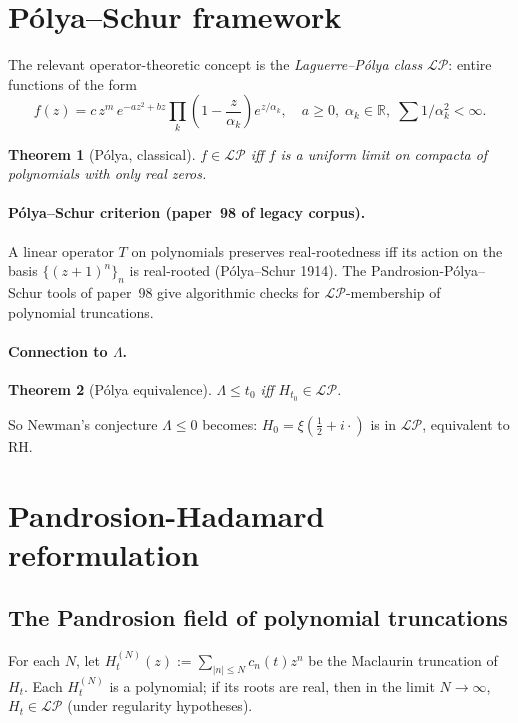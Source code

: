 \documentclass[11pt,a4paper]{article}
\newtheorem{theorem}{Theorem}[section]
\begin{document}
\section{P\'olya--Schur framework}\label{sec:polya}

The relevant operator-theoretic concept is the \emph{Laguerre--P\'olya class}
$\mathcal{LP}$: entire functions of the form
\[
f(z) = c\, z^m\, e^{-az^2 + bz}\prod_{k}\left(1 - \frac{z}{\alpha_k}\right) e^{z/\alpha_k},
\quad a \ge 0, \; \alpha_k \in \mathbb{R}, \; \sum 1/\alpha_k^2 < \infty.
\]

\begin{theorem}[P\'olya, classical]\label{thm:polya}
$f \in \mathcal{LP}$ iff $f$ is a uniform limit on compacta of polynomials
with only real zeros.
\end{theorem}

\paragraph{P\'olya--Schur criterion (paper~98 of legacy corpus).}
A linear operator $T$ on polynomials preserves real-rootedness iff its action
on the basis $\{(z+1)^n\}_n$ is real-rooted (P\'olya--Schur 1914). The
Pandrosion-P\'olya--Schur tools of paper~98 give algorithmic checks for
$\mathcal{LP}$-membership of polynomial truncations.

\paragraph{Connection to $\Lambda$.}
\begin{theorem}[P\'olya equivalence]\label{thm:polya-equiv}
$\Lambda \le t_0$ iff $H_{t_0} \in \mathcal{LP}$.
\end{theorem}

\noindent So Newman's conjecture $\Lambda \le 0$ becomes:
$H_0 = \xi(\tfrac{1}{2} + i\cdot)$ is in $\mathcal{LP}$, equivalent to RH.

\section{Pandrosion-Hadamard reformulation}\label{sec:reform}

\subsection{The Pandrosion field of polynomial truncations}

For each $N$, let $H_t^{(N)}(z) := \sum_{|n| \le N} c_n(t) z^n$ be the
Maclaurin truncation of $H_t$. Each $H_t^{(N)}$ is a polynomial; if its
roots are real, then in the limit $N \to \infty$, $H_t \in \mathcal{LP}$
(under regularity hypotheses).
\end{document}
